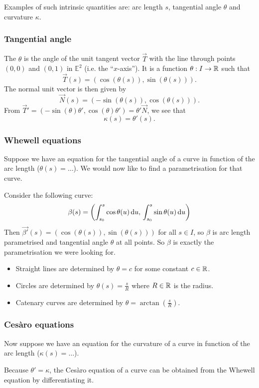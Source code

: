 Examples of such intrinsic quantities are: arc length $s$, tangential angle $\theta$ and curvature $\kappa$.
\subsubsection{Tangential angle}
The  $\theta$ is the angle of the unit tangent vector $\vec{T}$ with the line through points $(0,0)$ and $(0,1)$ in $\mathbb{E}^2$ (i.e. the ``$x$-axis''). It is a function $\theta: I \to \mathbb{R}$ such that
\[ \vec{T}(s) = (\cos(\theta(s)), \sin(\theta(s))). \]
The normal unit vector is then given by
\[ \vec{N}(s) = (-\sin(\theta(s)), \cos(\theta(s))). \]
From $\vec{T}' = (-\sin(\theta)\theta', \cos(\theta)\theta') = \theta'\vec{N}$, we see that
\[ \kappa(s) = \theta'(s). \]

\subsubsection{Whewell equations}
Suppose we have an equation for the tangential angle of a curve in function of the arc length ($\theta(s) = \ldots$). We would now like to find a parametrisation for that curve.

Consider the following curve:
\[ \beta(s) = \left(\int_{s_0}^s\cos\theta(u) \operatorname{d \!}{u},\, \int^s_{s_0}\sin\theta(u) \operatorname{d \!}{u}\right) \]
Then $\vec{\beta'}(s) = (\cos(\theta(s)),\sin(\theta(s)))$ for all $s\in I$, so $\beta$ is arc length parametrised and tangential angle $\theta$ at all points. So $\beta$ is exactly the parametrisation we were looking for.

\begin{example}
\begin{itemize}
\item Straight lines are determined by $\theta = c$ for some constant $c\in\mathbb{R}$.
\item Circles are determined by $\theta(s) = \frac{s}{R}$ where $R\in \mathbb{R}$ is the radius.
\item Catenary curves are determined by $\theta = \arctan \left(\frac{s}{R}\right)$.
\end{itemize}
\end{example}
\subsubsection{Cesàro equations}
Now suppose we have an equation for the curvature of a curve in function of the arc length ($\kappa(s) = \ldots$).

Because $\theta' = \kappa$, the Cesàro equation of a curve can be obtained from the Whewell equation by differentiating it.


